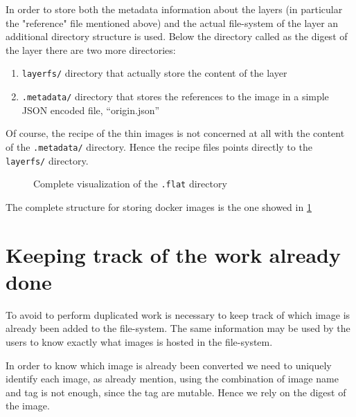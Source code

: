 In order to store both the metadata information about the layers (in particular
the "reference" file mentioned above) and the actual file-system of the layer
an additional directory structure is used. Below the directory called as the
digest of the layer there are two more directories: 
\begin{enumerate} 
        \item \texttt{layerfs/} directory that actually store the content of the layer
        \item \texttt{.metadata/} directory that stores the references to the image in a simple JSON encoded file, “origin.json”
\end{enumerate}

Of course, the recipe of the thin images is not concerned at all with the
content of the \texttt{.metadata/} directory.  Hence the recipe files points
directly to the \texttt{layerfs/} directory.

\begin{figure}
\caption{Complete visualization of the \texttt{.flat} directory}
\label{fig:docker-layer-structure}
\end{figure}

The complete structure for storing docker images is the one showed in
\ref{fig:docker-layer-structure}

\section{Keeping track of the work already done}

To avoid to perform duplicated work is necessary to keep track of which image
is already been added to the file-system. The same information may be used by
the users to know exactly what images is hosted in the file-system.

In order to know which image is already been converted we need to uniquely
identify each image, as already mention, using the combination of image name
and tag is not enough, since the tag are mutable.  Hence we rely on the digest
of the image.

